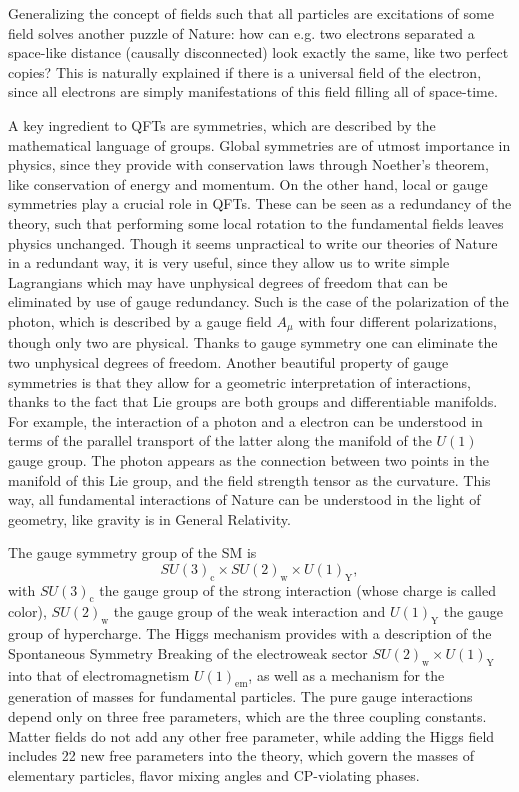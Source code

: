 Generalizing the concept of fields such that all particles are excitations of some field solves another puzzle of Nature: how can e.g. two electrons separated a space-like distance (causally disconnected) look exactly the same, like two perfect copies? This is naturally explained if there is a universal field of the electron, since all electrons are simply manifestations of this field filling all of space-time. 

A key ingredient to QFTs are symmetries, which are described by the mathematical language of groups. Global symmetries are of utmost importance in physics, since they provide with conservation laws through Noether's theorem, like conservation of energy and momentum. On the other hand, local or gauge symmetries play a crucial role in QFTs. These can be seen as a redundancy of the theory, such that performing some local rotation to the fundamental fields leaves physics unchanged. Though it seems unpractical to write our theories of Nature in a redundant way, it is very useful, since they allow us to write simple Lagrangians which may have unphysical degrees of freedom that can be eliminated by use of gauge redundancy. Such is the case of the polarization of the photon, which is described by a gauge field $A_{\mu}$ with four different polarizations, though only two are physical. Thanks to gauge symmetry one can eliminate the two unphysical degrees of freedom. Another beautiful property of gauge symmetries is that they allow for a geometric interpretation of interactions, thanks to the fact that Lie groups are both groups and differentiable manifolds. For example, the interaction of a photon and a electron can be understood in terms of the parallel transport of the latter along the manifold of the $U(1)$ gauge group. The photon appears as the connection between two points in the manifold of this Lie group, and the field strength tensor as the curvature. This way, all fundamental interactions of Nature can be understood in the light of geometry, like gravity is in General Relativity.

The gauge symmetry group of the SM is
\begin{equation}
SU(3)_{\textrm{c}}\times SU(2)_{\textrm{w}}\times U(1)_{\textrm{Y}},
\end{equation}
with $SU(3)_{\textrm{c}}$ the gauge group of the strong interaction (whose charge is called color), $SU(2)_{\textrm{w}}$ the gauge group of the weak interaction and $U(1)_{\textrm{Y}}$ the gauge group of hypercharge. The Higgs mechanism provides with a description of the Spontaneous Symmetry Breaking of the electroweak sector $SU(2)_{\textrm{w}}\times U(1)_{\textrm{Y}}$ into that of electromagnetism $U(1)_{\textrm{em}}$, as well as a mechanism for the generation of masses for fundamental particles. The pure gauge interactions depend only on three free parameters, which are the three coupling constants. Matter fields do not add any other free parameter, while adding the Higgs field includes 22 new free parameters into the theory, which govern the masses of elementary particles, flavor mixing angles and CP-violating phases.

